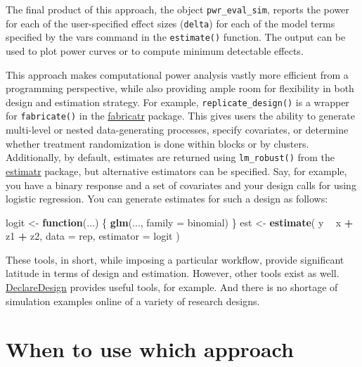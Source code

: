 \documentclass[
  12pt,
]{book}
\newenvironment{Shaded}{\begin{snugshade}}{\end{snugshade}}
\newcommand{\ControlFlowTok}[1]{\textcolor[rgb]{0.13,0.29,0.53}{\textbf{#1}}}
\newcommand{\DataTypeTok}[1]{\textcolor[rgb]{0.13,0.29,0.53}{#1}}
\newcommand{\KeywordTok}[1]{\textcolor[rgb]{0.13,0.29,0.53}{\textbf{#1}}}
\newcommand{\NormalTok}[1]{#1}
\newcommand{\OperatorTok}[1]{\textcolor[rgb]{0.81,0.36,0.00}{\textbf{#1}}}
\newcommand{\StringTok}[1]{\textcolor[rgb]{0.31,0.60,0.02}{#1}}
\theoremstyle{definition}
\theoremstyle{definition}
\theoremstyle{definition}
\theoremstyle{remark}
\begin{document}
The final product of this approach, the object \texttt{pwr\_eval\_sim},
reports the power for each of the user-specified effect sizes
(\texttt{delta}) for each of the model terms specified by the vars
command in the \texttt{estimate()} function. The output can be used to
plot power curves or to compute minimum detectable effects.

This approach makes computational power analysis vastly more efficient
from a programming perspective, while also providing ample room for
flexibility in both design and estimation strategy. For example,
\texttt{replicate\_design()} is a wrapper for \texttt{fabricate()} in
the \href{https://declaredesign.org/r/fabricatr/}{fabricatr} package.
This gives users the ability to generate multi-level or nested
data-generating processes, specify covariates, or determine whether
treatment randomization is done within blocks or by clusters.
Additionally, by default, estimates are returned using
\texttt{lm\_robust()} from the
\href{https://declaredesign.org/r/estimatr/}{estimatr} package, but
alternative estimators can be specified. Say, for example, you have a
binary response and a set of covariates and your design calls for using
logistic regression. You can generate estimates for such a design as
follows:

\begin{Shaded}
\begin{Highlighting}[]
\NormalTok{logit <-}\StringTok{ }\ControlFlowTok{function}\NormalTok{(...) \{}
  \KeywordTok{glm}\NormalTok{(..., }\DataTypeTok{family =}\NormalTok{ binomial)}
\NormalTok{\}}
\NormalTok{est <-}\StringTok{ }\KeywordTok{estimate}\NormalTok{(}
\NormalTok{  y }\OperatorTok{~}\StringTok{ }\NormalTok{x }\OperatorTok{+}\StringTok{ }\NormalTok{z1 }\OperatorTok{+}\StringTok{ }\NormalTok{z2,}
  \DataTypeTok{data =}\NormalTok{ rep, }\DataTypeTok{estimator =}\NormalTok{ logit}
\NormalTok{)}
\end{Highlighting}
\end{Shaded}

These tools, in short, while imposing a particular workflow, provide
significant latitude in terms of design and estimation. However, other
tools exist as well.
\href{https://declaredesign.org/r/declaredesign/articles/DeclareDesign_101.html}{DeclareDesign}
provides useful tools, for example. And there is no shortage of
simulation examples online of a variety of research designs.

\hypertarget{when-to-use-which-approach}{%
\section{When to use which approach}\label{when-to-use-which-approach}}
\end{document}

